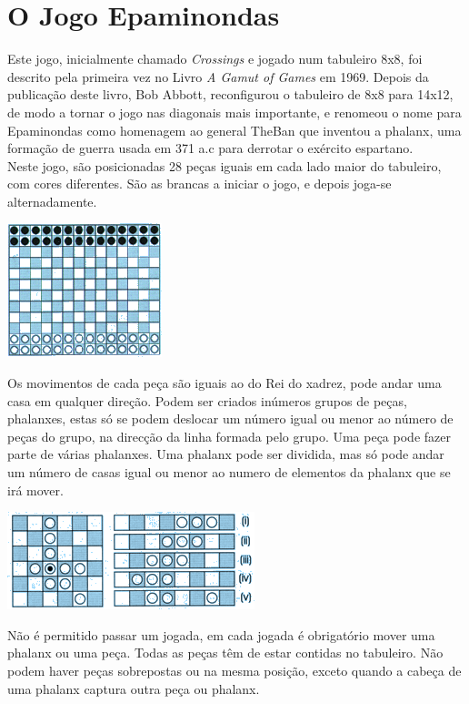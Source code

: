 \documentclass[a4paper]{article}
\begin{document}
\section{O Jogo Epaminondas}
Este jogo, inicialmente chamado \textit{Crossings} e jogado num tabuleiro 8x8, foi descrito pela primeira vez no Livro \textit{A Gamut of Games} em 1969.
Depois da publicação deste livro, Bob Abbott, reconfigurou o tabuleiro de 8x8 para 14x12, de modo a tornar o jogo nas diagonais mais importante, e renomeou
o nome para Epaminondas como homenagem ao general TheBan que inventou a phalanx, uma formação de guerra usada em 371 a.c para derrotar o exército espartano.\cite{creator,rules}
\\\linebreak
Neste jogo, são posicionadas 28 peças iguais em cada lado maior do tabuleiro, com cores diferentes. São as brancas a iniciar o jogo, e depois joga-se alternadamente.\cite{rules}
\begin{center}
  \includegraphics[scale=0.60]{epaTOP.png}
\end{center}
Os movimentos de cada peça são iguais ao do Rei do xadrez, pode andar uma casa em qualquer direção. Podem ser criados inúmeros grupos de peças, phalanxes, estas só se podem deslocar um número igual ou menor ao número de peças do grupo, na direcção da linha formada pelo grupo. Uma peça pode fazer parte de várias phalanxes. Uma phalanx pode ser dividida, mas só pode andar um número de casas igual ou menor ao numero de elementos da phalanx que se irá mover.\cite{rules}
\begin{center}
  \includegraphics[scale=0.60]{epa1-2.png}
\end{center}
Não é permitido passar um jogada, em cada jogada é obrigatório mover uma phalanx ou uma peça. Todas as peças têm de estar contidas no tabuleiro. Não podem haver peças sobrepostas ou na mesma posição, exceto quando a cabeça de uma phalanx captura outra peça ou phalanx.
\end{document}

